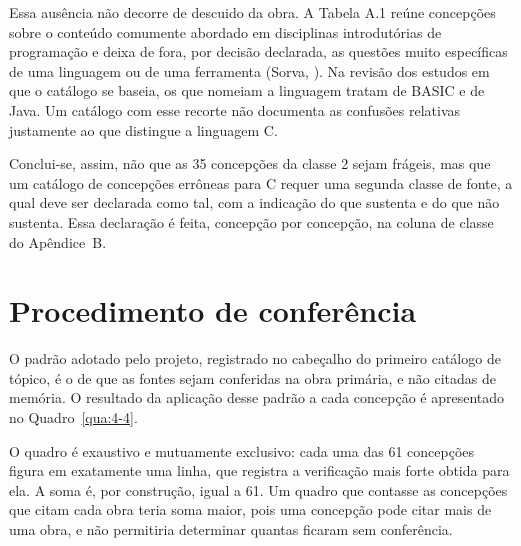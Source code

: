 Essa ausência não decorre de descuido da obra. A Tabela A.1 reúne concepções sobre o conteúdo comumente abordado em disciplinas introdutórias de programação e deixa de fora, por decisão declarada, as questões muito específicas de uma linguagem ou de uma ferramenta (Sorva, \citeyear{sorva2012}). Na revisão dos estudos em que o catálogo se baseia, os que nomeiam a linguagem tratam de BASIC e de Java. Um catálogo com esse recorte não documenta as confusões relativas justamente ao que distingue a linguagem C.

Conclui-se, assim, não que as 35 concepções da classe 2 sejam frágeis, mas que um catálogo de concepções errôneas para C requer uma segunda classe de fonte, a qual deve ser declarada como tal, com a indicação do que sustenta e do que não sustenta. Essa declaração é feita, concepção por concepção, na coluna de classe do Apêndice~B.

\section{Procedimento de conferência}

O padrão adotado pelo projeto, registrado no cabeçalho do primeiro catálogo de tópico, é o de que as fontes sejam conferidas na obra primária, e não citadas de memória. O resultado da aplicação desse padrão a cada concepção é apresentado no Quadro~\ref{qua:4-4}.

O quadro é exaustivo e mutuamente exclusivo: cada uma das 61 concepções figura em exatamente uma linha, que registra a verificação mais forte obtida para ela. A soma é, por construção, igual a 61. Um quadro que contasse as concepções que citam cada obra teria soma maior, pois uma concepção pode citar mais de uma obra, e não permitiria determinar quantas ficaram sem conferência.

